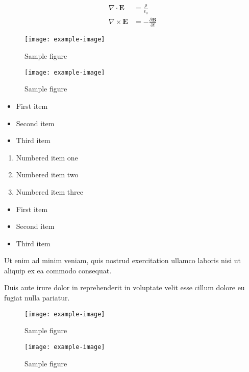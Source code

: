 \documentclass{article}
\begin{document}
\begin{align}
    \nabla \cdot \mathbf{E} &= \frac{\rho}{\epsilon_0} \\
    \nabla \times \mathbf{E} &= -\frac{\partial \mathbf{B}}{\partial t}
\end{align}

\begin{figure}[h]
    \centering
    \texttt{[image: example-image]}
    \caption{Sample figure}
    \label{fig:sample}
\end{figure}

\begin{figure}[h]
    \centering
    \texttt{[image: example-image]}
    \caption{Sample figure}
    \label{fig:sample}
\end{figure}

\begin{itemize}
\item First item
\item Second item
\item Third item
\end{itemize}


\begin{enumerate}
\item Numbered item one
\item Numbered item two
\item Numbered item three
\end{enumerate}

\begin{itemize}
\item First item
\item Second item
\item Third item
\end{itemize}

Ut enim ad minim veniam, quis nostrud exercitation ullamco laboris nisi ut aliquip ex ea commodo consequat.

Duis aute irure dolor in reprehenderit in voluptate velit esse cillum dolore eu fugiat nulla pariatur.

\begin{figure}[h]
    \centering
    \texttt{[image: example-image]}
    \caption{Sample figure}
    \label{fig:sample}
\end{figure}

\begin{figure}[h]
    \centering
    \texttt{[image: example-image]}
    \caption{Sample figure}
    \label{fig:sample}
\end{figure}
\end{document}
